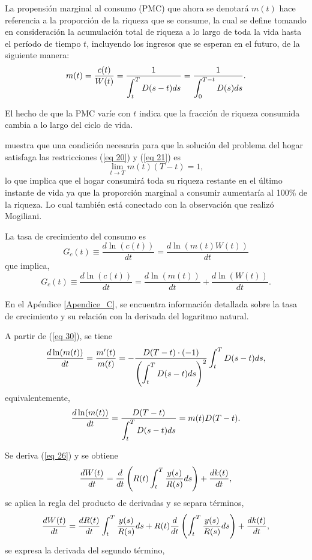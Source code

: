 La propensión marginal al consumo (PMC) que ahora se denotará $m(t)$ hace referencia a la proporción de la riqueza que se consume, la cual se define tomando en consideración la acumulación total de riqueza a lo largo de toda la vida hasta el período de tiempo $t$, incluyendo los ingresos que se esperan en el futuro, de la siguiente manera:
\begin{equation}
\label{eq 30}
    m(t)= \dfrac{c(t)}{W(t)}=\dfrac{1}{\displaystyle \int_t^T D(s-t) ds}=\dfrac{1}{\displaystyle \int_0^{T-t} D(s) ds}.
\end{equation}

El hecho de que la PMC varíe con $t$ indica que la fracción de riqueza consumida cambia a lo largo del ciclo de vida.

\parencite{Feigenbaum16} muestra que una condición necesaria para que la solución del problema del hogar satisfaga las restricciones (\ref{eq 20}) y (\ref{eq 21}) es 
\begin{equation}
\label{eq 31}
    \lim_{t \to T} m(t) (T-t) =1,
\end{equation}
lo que implica que el hogar consumirá toda su riqueza restante en el último instante de vida ya que la proporción marginal a consumir aumentaría al 100\% de la riqueza. Lo cual también está conectado con la observación que realizó Mogiliani.

La tasa de crecimiento del consumo es
$$  G_c(t) \equiv \dfrac{d \ln (c(t))}{dt}=\dfrac{d \ln(m(t)W(t))}{dt}$$
que implica,
\begin{equation}
\label{eq 32}
    G_c(t) \equiv \dfrac{d \ln (c(t))}{dt}=\dfrac{d \ln (m(t))}{dt}+\dfrac{d \ln (W(t))}{dt}.
\end{equation}

En el Apéndice \ref{Apendice_C}, se encuentra información detallada sobre la tasa de crecimiento y su relación con la derivada del logaritmo natural.

A partir de (\ref{eq 30}), se tiene
$$\dfrac{d \ln (m(t))}{dt}=\dfrac{m'(t)}{m(t)}=- \dfrac{D(T-t)\cdot (-1)}{\left( \displaystyle \int_t^T D(s-t) ds \right)^2} \int_t^T D(s-t) ds,$$
equivalentemente,
\begin{equation}
\label{eq 33}
    \dfrac{d \ln (m(t))}{dt}= \dfrac{D(T-t)}{\displaystyle \int_t^T D(s-t) ds}=m(t) D(T-t).
\end{equation}

\noindent Se deriva (\ref{eq 26}) y se obtiene
$$\dfrac{dW(t)}{dt}= \displaystyle \dfrac{d}{dt} \left( R(t) \int_t^T \dfrac{y(s)}{R(s)} ds \right) + \dfrac{dk(t)}{dt},$$
se aplica la regla del producto de derivadas y se separa términos,
$$\dfrac{dW(t)}{dt}= \displaystyle \dfrac{d R(t)}{dt} \int_t^T \dfrac{y(s)}{R(s)} ds  + R(t) \dfrac{d}{dt} \left( \int_t^T \dfrac{y(s)}{R(s)} ds \right)+\dfrac{dk(t)}{dt},$$
se expresa la derivada del segundo término,

